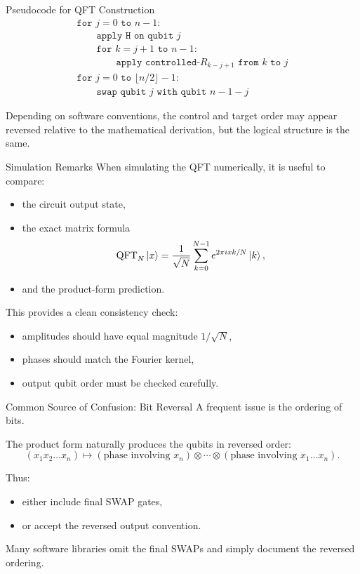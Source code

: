 \documentclass{beamer}
\begin{document}
\begin{frame}{Pseudocode for QFT Construction}
\[
\begin{array}{l}
\texttt{for } j=0 \texttt{ to } n-1: \\
\qquad \texttt{apply H on qubit } j \\
\qquad \texttt{for } k=j+1 \texttt{ to } n-1: \\
\qquad\qquad \texttt{apply controlled-}R_{k-j+1}\texttt{ from } k \texttt{ to } j \\
\texttt{for } j=0 \texttt{ to } \lfloor n/2\rfloor-1: \\
\qquad \texttt{swap qubit } j \texttt{ with qubit } n-1-j
\end{array}
\]

Depending on software conventions, the control and target order may appear reversed relative to the mathematical derivation, but the logical structure is the same.
\end{frame}

\begin{frame}{Simulation Remarks}
When simulating the QFT numerically, it is useful to compare:
\begin{itemize}
\item the circuit output state,
\item the exact matrix formula
\[
\operatorname{QFT}_N\ket{x}
=
\frac{1}{\sqrt N}\sum_{k=0}^{N-1} e^{2\pi i xk/N}\ket{k},
\]
\item and the product-form prediction.
\end{itemize}

This provides a clean consistency check:
\begin{itemize}
\item amplitudes should have equal magnitude \(1/\sqrt N\),
\item phases should match the Fourier kernel,
\item output qubit order must be checked carefully.
\end{itemize}
\end{frame}

\begin{frame}{Common Source of Confusion: Bit Reversal}
A frequent issue is the ordering of bits.

The product form naturally produces the qubits in reversed order:
\[
(x_1x_2\dots x_n)\mapsto
(\text{phase involving }x_n)\otimes \cdots \otimes (\text{phase involving }x_1\dots x_n).
\]

Thus:
\begin{itemize}
\item either include final SWAP gates,
\item or accept the reversed output convention.
\end{itemize}

Many software libraries omit the final SWAPs and simply document the reversed ordering.
\end{frame}
\end{document}
